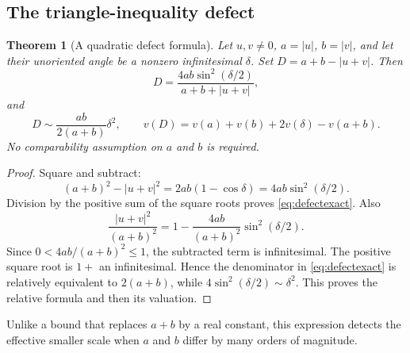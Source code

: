 \documentclass[11pt,letterpaper]{article}
\newtheorem{theorem}{Theorem}[section]
\theoremstyle{definition}
\theoremstyle{remark}
\numberwithin{equation}{section}
\begin{document}
\subsection{The triangle-inequality defect}
\begin{theorem}[A quadratic defect formula]\label{thm:defect}
Let $u,v\ne0$, $a=|u|$, $b=|v|$, and let their unoriented angle be a nonzero infinitesimal $\delta$. Set $D=a+b-|u+v|$. Then
\begin{equation}\label{eq:defectexact}
 D=\frac{4ab\sin^2(\delta/2)}{a+b+|u+v|},
\end{equation}
and
\begin{equation}\label{eq:defectasym}
 D\sim\frac{ab}{2(a+b)}\delta^2,
 \qquad v(D)=v(a)+v(b)+2v(\delta)-v(a+b).
\end{equation}
No comparability assumption on $a$ and $b$ is required.
\end{theorem}
\begin{proof}
Square and subtract:
\[
 (a+b)^2-|u+v|^2=2ab(1-\cos\delta)=4ab\sin^2(\delta/2).
\]
Division by the positive sum of the square roots proves \eqref{eq:defectexact}. Also
\[
 \frac{|u+v|^2}{(a+b)^2}
 =1-\frac{4ab}{(a+b)^2}\sin^2(\delta/2).
\]
Since $0<4ab/(a+b)^2\le1$, the subtracted term is infinitesimal. The positive square root is $1+$ an infinitesimal. Hence the denominator in \eqref{eq:defectexact} is relatively equivalent to $2(a+b)$, while $4\sin^2(\delta/2)\sim\delta^2$. This proves the relative formula and then its valuation.
\end{proof}
Unlike a bound that replaces $a+b$ by a real constant, this expression detects the effective smaller scale when $a$ and $b$ differ by many orders of magnitude.
\end{document}
